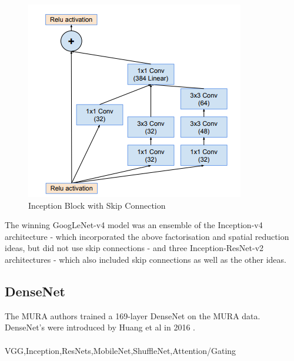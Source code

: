 \documentclass[11pt]{article} %
\theoremstyle{plain}
\theoremstyle{definition}
\begin{document}
\begin{itemize}
    \begin{figure}[!ht]
        \centering    
        \caption{Inception Block with Skip Connection}
        \label{fig:InceptionResNet}
        \includegraphics[scale=0.7]{InceptionResNet.PNG}
    \end{figure}
\end{itemize}
The winning GoogLeNet-v4 model was an ensemble of the Inception-v4 architecture - which incorporated the above factorisation and spatial reduction ideas, but did not use skip connections - and three Inception-ResNet-v2 architectures - which also included skip connections as well as the other ideas. 

\subsection{DenseNet}
The MURA authors trained a 169-layer DenseNet on the MURA data. DenseNet's were introduced by Huang et al in 2016 \cite{DenseNet_Paper}.
\\
\\
\noindent
VGG,Inception,ResNets,MobileNet,ShuffleNet,Attention/Gating



\clearpage
\newpage
\end{document}
